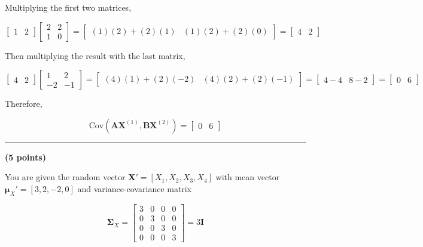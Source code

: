 \documentclass[12pt]{article}
\begin{document}
\begin{enumerate}
Multiplying the first two matrices,

$$
\begin{bmatrix} 1 & 2 \end{bmatrix} \begin{bmatrix} 2 & 2 \\ 1 & 0 \end{bmatrix} =
\begin{bmatrix} (1)(2)+(2)(1) & (1)(2)+(2)(0) \end{bmatrix}
= \begin{bmatrix} 4 & 2 \end{bmatrix}
$$

Then multiplying the result with the last matrix,

$$
\begin{bmatrix} 4 & 2 \end{bmatrix}
\begin{bmatrix} 1 & 2 \\ -2 & -1 \end{bmatrix}
=
\begin{bmatrix} (4)(1)+(2)(-2) & (4)(2)+(2)(-1) \end{bmatrix}
=
\begin{bmatrix} 4-4 & 8-2 \end{bmatrix} 
= 
\begin{bmatrix} 0 & 6 \end{bmatrix}
$$

Therefore, 

$$
\boxed{
\text{Cov}(\mathbf{A}\mathbf{X}^{(1)}, \mathbf{B}\mathbf{X}^{(2)}) = \begin{bmatrix} 0 & 6 \end{bmatrix}
}
$$

\end{enumerate}

\vspace{2em}

\noindent\rule{\textwidth}{0.4pt}

\vspace{2em}

 \hfill {\large \textbf{(5 points)}}

\vspace{1em}

\noindent You are given the random vector $\mathbf{X}' = [X_1, X_2, X_3, X_4]$ with mean vector $\boldsymbol{\mu}_X' = [3, 2, -2, 0]$ and variance-covariance matrix

$$
\boldsymbol{\Sigma}_X =
\begin{bmatrix}
3 & 0 & 0 & 0 \\
0 & 3 & 0 & 0 \\
0 & 0 & 3 & 0 \\
0 & 0 & 0 & 3
\end{bmatrix}
= 3\mathbf{I}
$$
\end{document}
